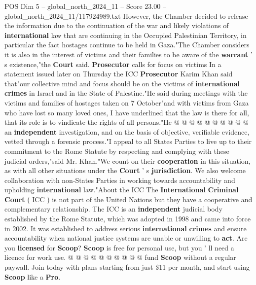 \begin{textsample}{POS Dim 5 – global\_north\_2024\_11 – Score 23.00 – global\_north\_2024\_11/117924989.txt}
However, the Chamber decided to release the information due to the continuation of the war and likely violations of \textbf{international} law that are continuing in the Occupied Palestinian Territory, in particular the fact hostages continue to be held in Gaza."The Chamber considers it is also in the interest of victims and their families to be aware of the \textbf{warrant} ' s existence,"the \textbf{Court} said. \textbf{Prosecutor} calls for focus on victims In a statement issued later on Thursday the ICC \textbf{Prosecutor} Karim Khan said that"our collective mind and focus should be on the victims of \textbf{international} \textbf{crimes} in Israel and in the State of Palestine."He said during meetings with the victims and families of hostages taken on 7 October"and with victims from Gaza who have lost so many loved ones, I have underlined that the law is there for all, that its role is to vindicate the rights of all persons."He @ @ @ @ @ @ @ @ @ @ an \textbf{independent} investigation, and on the basis of objective, verifiable evidence, vetted through a forensic process."I appeal to all States Parties to live up to their commitment to the Rome Statute by respecting and complying with these judicial orders,"said Mr.
Khan."We count on their \textbf{cooperation} in this situation, as with all other situations under the \textbf{Court} ' s \textbf{jurisdiction}.
We also welcome collaboration with non-States Parties in working towards accountability and upholding \textbf{international} law."About the ICC The \textbf{International} \textbf{Criminal} \textbf{Court} ( ICC ) is not part of the United Nations but they have a cooperative and complementary relationship.
The ICC is an \textbf{independent} judicial body established by the Rome Statute, which was adopted in 1998 and came into force in 2002.
It was established to address serious \textbf{international} \textbf{crimes} and ensure accountability when national justice systems are unable or unwilling to \textbf{act}.
Are you \textbf{licensed} for \textbf{Scoop}? \textbf{Scoop} is free for personal use, but you ' ll need a licence for work use. @ @ @ @ @ @ @ @ @ @ fund \textbf{Scoop} without a regular paywall.
Join today with plans starting from just \$11 per month, and start using \textbf{Scoop} like a \textbf{Pro}.

\end{textsample}

